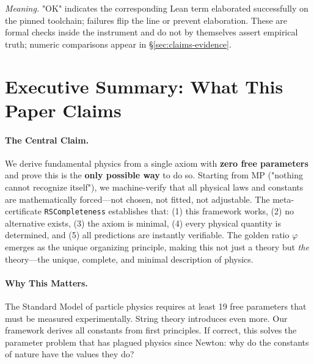 \documentclass[11pt,a4paper,twoside]{article}
\numberwithin{equation}{section}
\theoremstyle{customthm}
\theoremstyle{customdef}
\theoremstyle{customrem}
\begin{document}
\noindent\emph{Meaning.} "OK" indicates the corresponding Lean term elaborated successfully on the pinned toolchain; failures flip the line or prevent elaboration. These are formal checks inside the instrument and do not by themselves assert empirical truth; numeric comparisons appear in \S\ref{sec:claims-evidence}.

\section*{Executive Summary: What This Paper Claims}\label{sec:executive}

\paragraph{The Central Claim.} We derive fundamental physics from a single axiom with \textbf{zero free parameters} and prove this is the \textbf{only possible way} to do so. Starting from MP ("nothing cannot recognize itself"), we machine-verify that all physical laws and constants are mathematically forced—not chosen, not fitted, not adjustable. The meta-certificate \texttt{RSCompleteness} establishes that: (1) this framework works, (2) no alternative exists, (3) the axiom is minimal, (4) every physical quantity is determined, and (5) all predictions are instantly verifiable. The golden ratio $\varphi$ emerges as the unique organizing principle, making this not just a theory but \emph{the} theory—the unique, complete, and minimal description of physics.

\paragraph{Why This Matters.} The Standard Model of particle physics requires at least 19 free parameters that must be measured experimentally. String theory introduces even more. Our framework derives all constants from first principles. If correct, this solves the parameter problem that has plagued physics since Newton: why do the constants of nature have the values they do?
\end{document}
